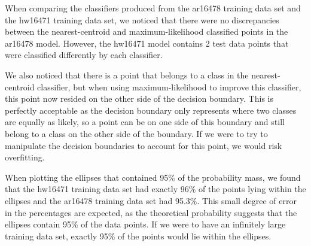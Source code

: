 \documentclass[a4paper]{article}
\begin{document}
When comparing the classifiers produced from the ar16478 training data set and the hw16471 training data set, we noticed that there were no discrepancies between the nearest-centroid and maximum-likelihood classified points in the ar16478 model. However, the hw16471 model contains 2 test data points that were classified differently by each classifier.

We also noticed that there is a point that belongs to a class in the nearest-centroid classifier, but when using maximum-likelihood to improve this classifier, this point now resided on the other side of the decision boundary. This is perfectly acceptable as the decision boundary only represents where two classes are equally as likely, so a point can be on one side of this boundary and still belong to a class on the other side of the boundary. If we were to try to manipulate the decision boundaries to account for this point, we would risk overfitting.

When plotting the ellipses that contained 95\% of the probability mass, we found that the hw16471 training data set had exactly 96\% of the points lying within the ellipses and the ar16478 training data set had 95.3\%. This small degree of error in the percentages are expected, as the theoretical probability suggests that the ellipses contain 95\% of the data points. If we were to have an infinitely large training data set, exactly 95\% of the points would lie within the ellipses. 
\end{document}
